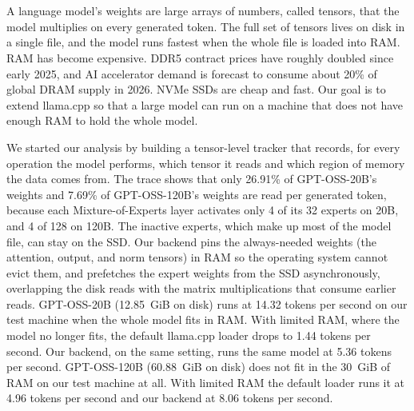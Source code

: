 \chapter{\abstractname}

A language model's weights are large arrays of numbers, called tensors, that the model multiplies on every generated token. The full set of tensors lives on disk in a single file, and the model runs fastest when the whole file is loaded into RAM. RAM has become expensive. DDR5 contract prices have roughly doubled since early 2025, and AI accelerator demand is forecast to consume about 20\% of global DRAM supply in 2026. NVMe SSDs are cheap and fast. Our goal is to extend llama.cpp so that a large model can run on a machine that does not have enough RAM to hold the whole model.

We started our analysis by building a tensor-level tracker that records, for every operation the model performs, which tensor it reads and which region of memory the data comes from. The trace shows that only 26.91\% of GPT-OSS-20B's weights and 7.69\% of GPT-OSS-120B's weights are read per generated token, because each Mixture-of-Experts layer activates only 4 of its 32 experts on 20B, and 4 of 128 on 120B. The inactive experts, which make up most of the model file, can stay on the SSD. Our backend pins the always-needed weights (the attention, output, and norm tensors) in RAM so the operating system cannot evict them, and prefetches the expert weights from the SSD asynchronously, overlapping the disk reads with the matrix multiplications that consume earlier reads. GPT-OSS-20B (12.85~GiB on disk) runs at 14.32 tokens per second on our test machine when the whole model fits in RAM. With limited RAM, where the model no longer fits, the default llama.cpp loader drops to 1.44 tokens per second. Our backend, on the same setting, runs the same model at 5.36 tokens per second. GPT-OSS-120B (60.88~GiB on disk) does not fit in the 30~GiB of RAM on our test machine at all. With limited RAM the default loader runs it at 4.96 tokens per second and our backend at 8.06 tokens per second.
